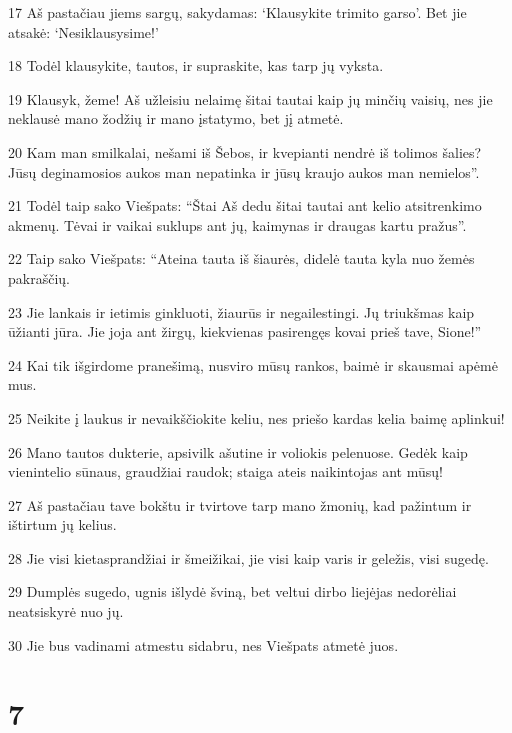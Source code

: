\par 17 Aš pastačiau jiems sargų, sakydamas: ‘Klausykite trimito garso’. Bet jie atsakė: ‘Nesiklausysime!’ 
\par 18 Todėl klausykite, tautos, ir supraskite, kas tarp jų vyksta. 
\par 19 Klausyk, žeme! Aš užleisiu nelaimę šitai tautai kaip jų minčių vaisių, nes jie neklausė mano žodžių ir mano įstatymo, bet jį atmetė. 
\par 20 Kam man smilkalai, nešami iš Šebos, ir kvepianti nendrė iš tolimos šalies? Jūsų deginamosios aukos man nepatinka ir jūsų kraujo aukos man nemielos”. 
\par 21 Todėl taip sako Viešpats: “Štai Aš dedu šitai tautai ant kelio atsitrenkimo akmenų. Tėvai ir vaikai suklups ant jų, kaimynas ir draugas kartu pražus”. 
\par 22 Taip sako Viešpats: “Ateina tauta iš šiaurės, didelė tauta kyla nuo žemės pakraščių. 
\par 23 Jie lankais ir ietimis ginkluoti, žiaurūs ir negailestingi. Jų triukšmas kaip ūžianti jūra. Jie joja ant žirgų, kiekvienas pasirengęs kovai prieš tave, Sione!” 
\par 24 Kai tik išgirdome pranešimą, nusviro mūsų rankos, baimė ir skausmai apėmė mus. 
\par 25 Neikite į laukus ir nevaikščiokite keliu, nes priešo kardas kelia baimę aplinkui! 
\par 26 Mano tautos dukterie, apsivilk ašutine ir voliokis pelenuose. Gedėk kaip vienintelio sūnaus, graudžiai raudok; staiga ateis naikintojas ant mūsų! 
\par 27 Aš pastačiau tave bokštu ir tvirtove tarp mano žmonių, kad pažintum ir ištirtum jų kelius. 
\par 28 Jie visi kietasprandžiai ir šmeižikai, jie visi kaip varis ir geležis, visi sugedę. 
\par 29 Dumplės sugedo, ugnis išlydė šviną, bet veltui dirbo liejėjas­ nedorėliai neatsiskyrė nuo jų. 
\par 30 Jie bus vadinami atmestu sidabru, nes Viešpats atmetė juos.



\chapter{7}


